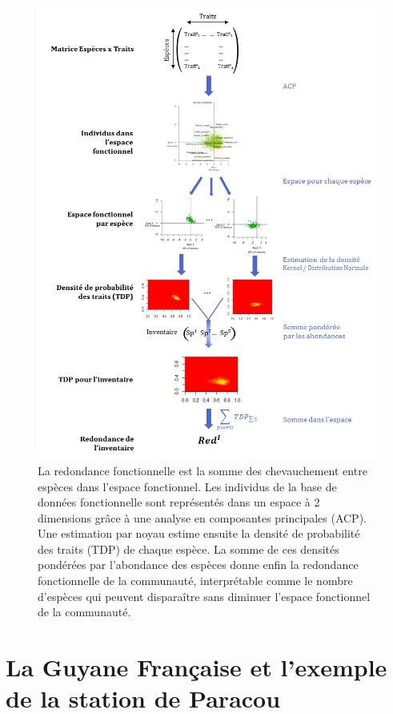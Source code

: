 \documentclass[11pt,french,A4paper,extrafontsizes,onecolumn,openright]{memoir}
\begin{document}
\begin{figure}

{\centering \includegraphics[width=1\linewidth]{ExternalFig/Fig_MesureRedondance} 

}

\caption{La redondance fonctionnelle est la somme des chevauchement entre espèces dans l'espace fonctionnel. Les individus de la base de données fonctionnelle sont représentés dans un espace à 2 dimensions grâce à une analyse en composantes principales (ACP). Une estimation par noyau estime ensuite la densité de probabilité des traits (TDP) de chaque espèce. La somme de ces densités pondérées par l'abondance des espèces donne enfin la redondance fonctionnelle de la communauté, interprétable comme le nombre d'espèces qui peuvent disparaître sans diminuer l'espace fonctionnel de la communauté.}\label{fig:RedundancyMethod}
\end{figure}

\section{La Guyane Française et l'exemple de la station de
Paracou}\label{la-guyane-francaise-et-lexemple-de-la-station-de-paracou}
\end{document}
